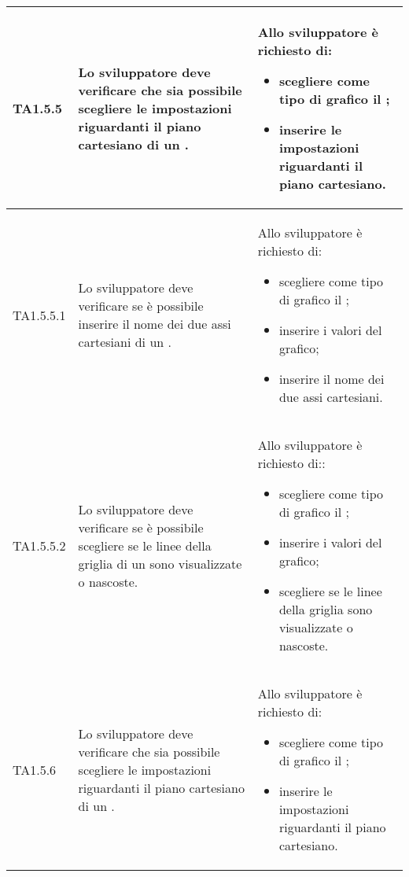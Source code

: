\begin{longtabu}{| X[0.5] | X | X |}
	TA1.5.5 & Lo sviluppatore deve verificare che sia possibile scegliere le impostazioni riguardanti il piano cartesiano di un .

		& Allo sviluppatore è richiesto di:
		\begin{itemize}
			\item scegliere come tipo di grafico il ;
			\item inserire le impostazioni riguardanti il piano cartesiano.
		\end{itemize}
\\ \hline

	TA1.5.5.1 & Lo sviluppatore deve verificare se è possibile inserire il nome dei due assi cartesiani di un .

		& Allo sviluppatore è richiesto di:
		\begin{itemize}
			\item scegliere come tipo di grafico il ;
			\item inserire i valori del grafico;
			\item inserire il nome dei due assi cartesiani.
		\end{itemize}
\\ \hline

	TA1.5.5.2 & Lo sviluppatore deve verificare se è possibile scegliere se le linee della griglia di un  sono visualizzate o nascoste.

		& Allo sviluppatore è richiesto di::
		\begin{itemize}
			\item scegliere come tipo di grafico il ;
			\item inserire i valori del grafico;
			\item scegliere se le linee della griglia sono visualizzate o nascoste.
		\end{itemize}
\\ \hline

	TA1.5.6 & Lo sviluppatore deve verificare che sia possibile scegliere le impostazioni riguardanti il piano cartesiano di un .

		& Allo sviluppatore è richiesto di:
		\begin{itemize}
			\item scegliere come tipo di grafico il ;
			\item inserire le impostazioni riguardanti il piano cartesiano.
		\end{itemize}
\\ \hline


\end{longtabu}
